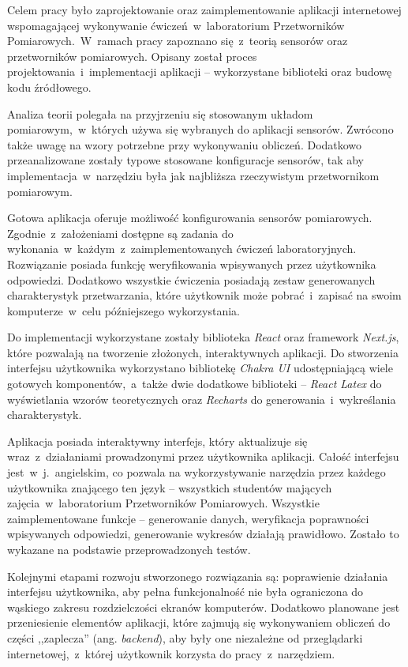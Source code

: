 Celem pracy było zaprojektowanie oraz zaimplementowanie aplikacji internetowej wspomagającej
wykonywanie ćwiczeń~w~laboratorium Przetworników Pomiarowych.~W~ramach pracy zapoznano się~z~teorią
sensorów oraz przetworników pomiarowych. Opisany został proces projektowania~i~implementacji
aplikacji -- wykorzystane biblioteki oraz budowę kodu źródłowego.

Analiza teorii polegała na przyjrzeniu się stosowanym układom pomiarowym,~w~których używa się
wybranych do aplikacji sensorów. Zwrócono także uwagę na wzory potrzebne przy wykonywaniu obliczeń.
Dodatkowo przeanalizowane zostały typowe stosowane konfiguracje sensorów, tak aby
implementacja~w~narzędziu była jak najbliższa rzeczywistym przetwornikom pomiarowym.

Gotowa aplikacja oferuje możliwość konfigurowania sensorów pomiarowych. Zgodnie~z~założeniami
dostępne są zadania do wykonania~w~każdym~z~zaimplementowanych ćwiczeń laboratoryjnych. Rozwiązanie
posiada funkcję weryfikowania wpisywanych przez użytkownika odpowiedzi. Dodatkowo wszystkie
ćwiczenia posiadają zestaw generowanych charakterystyk przetwarzania, które użytkownik może
pobrać~i~zapisać na swoim komputerze~w~celu późniejszego wykorzystania.

Do implementacji wykorzystane zostały biblioteka \textit{React} oraz framework \textit {Next.js},
które pozwalają na tworzenie złożonych, interaktywnych aplikacji. Do stworzenia interfejsu
użytkownika wykorzystano bibliotekę \textit{Chakra UI} udostępniającą wiele gotowych
komponentów,~a~także dwie dodatkowe biblioteki -- \textit{React Latex} do wyświetlania wzorów
teoretycznych oraz \textit{Recharts} do generowania~i~wykreślania charakterystyk.

Aplikacja posiada interaktywny interfejs, który aktualizuje się wraz~z~działaniami prowadzonymi
przez użytkownika aplikacji. Całość interfejsu jest~w~j.~angielskim, co pozwala na wykorzystywanie
narzędzia przez każdego użytkownika znającego ten język -- wszystkich studentów mających
zajęcia~w~laboratorium Przetworników Pomiarowych. Wszystkie zaimplementowane funkcje -- generowanie
danych, weryfikacja poprawności wpisywanych odpowiedzi, generowanie wykresów działają prawidłowo.
Zostało to wykazane na podstawie przeprowadzonych testów.

Kolejnymi etapami rozwoju stworzonego rozwiązania są: poprawienie działania interfejsu użytkownika,
aby pełna funkcjonalność nie była ograniczona do wąskiego zakresu rozdzielczości ekranów
komputerów. Dodatkowo planowane jest przeniesienie elementów aplikacji, które zajmują się
wykonywaniem obliczeń do części ,,zaplecza'' (ang. \textit{backend}), aby były one niezależne od
przeglądarki internetowej,~z~której użytkownik korzysta do pracy~z~narzędziem.